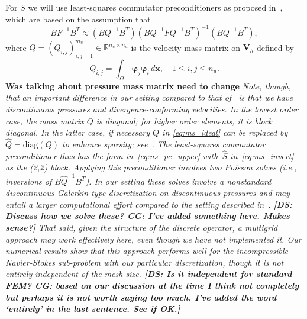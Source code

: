\documentclass{siamltex}
\newcommand{\uu}[1]{\boldsymbol #1}                     %
\begin{document}
For $S$ we will use least-squares commutator preconditioners as proposed in~\cite{ElmanHowle06,Elman06}, which are based on the assumption that
\begin{equation}
\label{eq:ms_ideal}
BF^{-1}B^T \approx  (B Q^{-1} B^T)(BQ^{-1}FQ^{-1}B^T)^{-1}(B Q^{-1} B^T),
\end{equation}
where $Q=(Q_{i,j})_{i,j=1}^{m_u} \in{\mathbb R}^{n_u \times n_u}$ is the velocity mass matrix on $\uu{V}_h$ defined by
\begin{equation}
\label{eq:pressure_mass}
Q_{i,j}=
\int_\Omega\, \uu{\varphi_j} \uu{\varphi_i} \,d\uu{x}, \quad 1\leq i,j \leq n_u.
\end{equation}
{\bf Was talking about pressure mass matrix need to change} \emph{Note, though, that an important difference in our setting compared to that of~\cite{Elman06} is that we have discontinuous pressures and divergence-conforming velocities.
In the lowest order case, the mass matrix $Q$ is diagonal; for higher order elements, it is block diagonal. In the latter case, if necessary $Q$ in \eqref{eq:ms_ideal} can be replaced by $\widehat{Q} = \mathrm{diag}(Q)$ to enhance sparsity; see~\cite[Remark 6.4]{Elman06}. %
The least-squares commutator preconditioner thus has the form in~\eqref{eq:ns_pc_upper} with~$\widehat{S}$ in~\eqref{eq:ms_invert} as the (2,2) block. Applying this preconditioner involves two Poisson solves (i.e., inversions of $B \widehat{Q}^{-1} B^T$). In our setting these solves involve a nonstandard discontinuous Galerkin type discretization on discontinuous pressures and may entail a larger computational effort compared to the setting described in~\cite{Elman06}. {\bf [DS: Discuss how we solve these? CG: I've added something here. Makes sense?]} That said, given the structure of the discrete operator, a multigrid approach may work effectively here, even though we have not implemented it.
Our numerical results show that this approach performs well for the incompressible Navier-Stokes sub-problem with our particular discretization, though it is not entirely independent of the mesh size.
{\bf [DS: Is it independent for standard FEM? CG: based on our discussion at the time I think not completely but perhaps it is not worth saying too much. I've added the word `entirely' in the last sentence. See if OK.]}}
\end{document}

